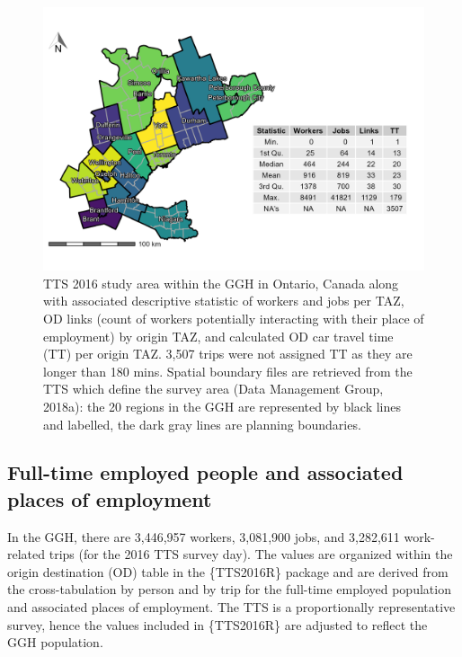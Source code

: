 \documentclass[Royal,times,sageh]{sagej}
\begin{document}
\begin{figure}[H]

{\centering \includegraphics[width=1\linewidth]{images/TTS16-survey-area} 

}

\caption{\label{fig:TTS-16-survey-area}TTS 2016 study area within the GGH in Ontario, Canada along with associated descriptive statistic of workers and jobs per TAZ, OD links (count of workers potentially interacting with their place of employment) by origin TAZ, and calculated OD car travel time (TT) per origin TAZ. 3,507 trips were not assigned TT as they are longer than 180 mins. Spatial boundary files are retrieved from the TTS which define the survey area (Data Management Group, 2018a): the 20 regions in the GGH are represented by black lines and labelled, the dark gray lines are planning boundaries.}\label{fig:TTS-16-survey-area}
\end{figure}

\hypertarget{full-time-employed-people-and-associated-places-of-employment}{%
\subsection{Full-time employed people and associated places of
employment}\label{full-time-employed-people-and-associated-places-of-employment}}

In the GGH, there are 3,446,957 workers, 3,081,900 jobs, and 3,282,611
work-related trips (for the 2016 TTS survey day). The values are
organized within the origin destination (OD) table in the \{TTS2016R\}
package and are derived from the cross-tabulation by person and by trip
for the full-time employed population and associated places of
employment. The TTS is a proportionally representative survey, hence the
values included in \{TTS2016R\} are adjusted to reflect the GGH
population.
\end{document}
